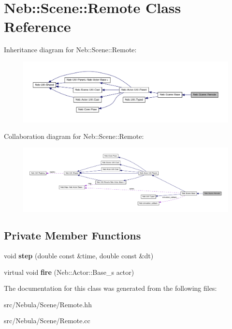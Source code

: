 \hypertarget{classNeb_1_1Scene_1_1Remote}{\section{\-Neb\-:\-:\-Scene\-:\-:\-Remote \-Class \-Reference}
\label{classNeb_1_1Scene_1_1Remote}
}


\-Inheritance diagram for \-Neb\-:\-:\-Scene\-:\-:\-Remote\-:\nopagebreak
\begin{figure}[H]
\begin{center}
\leavevmode
\includegraphics[width=350pt]{classNeb_1_1Scene_1_1Remote__inherit__graph}
\end{center}
\end{figure}


\-Collaboration diagram for \-Neb\-:\-:\-Scene\-:\-:\-Remote\-:\nopagebreak
\begin{figure}[H]
\begin{center}
\leavevmode
\includegraphics[width=350pt]{classNeb_1_1Scene_1_1Remote__coll__graph}
\end{center}
\end{figure}
\subsection*{\-Private \-Member \-Functions}
\begin{DoxyCompactItemize}
\item 
\hypertarget{classNeb_1_1Scene_1_1Remote_a43e7eb771cb4398b669cb57406454554}{void {\bfseries step} (double const \&time, double const \&dt)}\label{classNeb_1_1Scene_1_1Remote_a43e7eb771cb4398b669cb57406454554}

\item 
\hypertarget{classNeb_1_1Scene_1_1Remote_a1c60d252d91af9956f02a9fd013325fe}{virtual void {\bfseries fire} (\-Neb\-::\-Actor\-::\-Base\-\_\-s actor)}\label{classNeb_1_1Scene_1_1Remote_a1c60d252d91af9956f02a9fd013325fe}

\end{DoxyCompactItemize}


\-The documentation for this class was generated from the following files\-:\begin{DoxyCompactItemize}
\item 
src/\-Nebula/\-Scene/\-Remote.\-hh\item 
src/\-Nebula/\-Scene/\-Remote.\-cc\end{DoxyCompactItemize}
